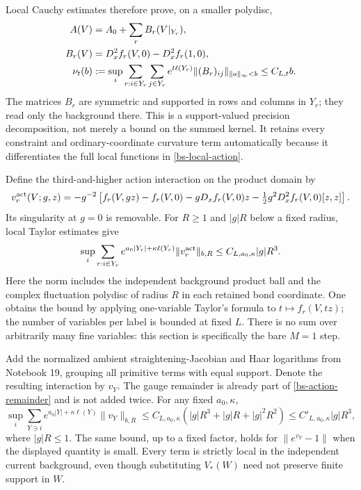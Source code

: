 \documentclass[11pt]{article}
\theoremstyle{remark}
\begin{document}
Local Cauchy estimates therefore prove, on a smaller polydisc,
\begin{align}
 A(V)&=A_0+\sum_r B_r(V|_{Y_r}),\label{bs-precision}\\
 B_r(V)&=D_x^2f_r(V,0)-D_x^2f_r(1,0),\notag\\
 \nu_t(b)&:=\sup_i\sum_{r:i\in Y_r}\sum_{j\in Y_r}
 e^{t\ell(Y_r)}\|(B_r)_{ij}\|_{\|a\|_\infty<b}
 \le C_{L,t}b.\label{bs-precision-norm}
\end{align}
The matrices $B_r$ are symmetric and supported in rows and
columns in $Y_r$; they read only the background there.
This is a support-valued precision decomposition, not merely
a bound on the summed kernel. It retains every constraint and
ordinary-coordinate curvature term automatically because it
differentiates the full local functions in \eqref{bs-local-action}.

Define the third-and-higher action interaction on the product
domain by
\begin{equation}\label{bs-action-remainder}
 v_r^{\rm act}(V;g,z)=-g^{-2}\left[
 f_r(V,gz)-f_r(V,0)-gD_xf_r(V,0)z
       -\tfrac12g^2D_x^2f_r(V,0)[z,z]\right].
\end{equation}
Its singularity at $g=0$ is removable. For $R\ge1$ and
$|g|R$ below a fixed radius, local Taylor estimates give
\begin{equation}\label{bs-remainder-norm}
 \sup_i\sum_{r:i\in Y_r} e^{a_0|Y_r|+\kappa\ell(Y_r)}
       \|v_r^{\rm act}\|_{b,R}
       \le C_{L,a_0,\kappa}|g|R^3.
\end{equation}
Here the norm includes the independent background product ball
and the complex fluctuation polydisc of radius $R$ in each
retained bond coordinate. One obtains the bound by applying
one-variable Taylor's formula to $t\mapsto f_r(V,tz)$;
the number of variables per label is bounded at fixed $L$.
There is no sum over arbitrarily many fine variables: this
section is specifically the bare $M=1$ step.

Add the normalized ambient straightening-Jacobian and Haar
logarithms from Notebook 19, grouping all primitive terms with
equal support. Denote the resulting interaction by $v_Y$.
The gauge remainder is already part of
\eqref{bs-action-remainder} and is not added twice. For any
fixed $a_0,\kappa$,
\begin{equation}\label{bs-full-interaction}
 \sup_i\sum_{Y\ni i} e^{a_0|Y|+\kappa\ell(Y)}
           \|v_Y\|_{b,R}
 \le C_{L,a_0,\kappa}
       (|g|R^3+|g|R+|g|^2R^2)
 \le C'_{L,a_0,\kappa}|g|R^3,
\end{equation}
where $|g|R\le1$. The same bound, up to a fixed factor,
holds for $\|e^{v_Y}-1\|$ when the displayed quantity is
small. Every term is strictly local in the independent current
background, even though substituting $V_*(W)$ need not preserve
finite support in $W$.
\end{document}
